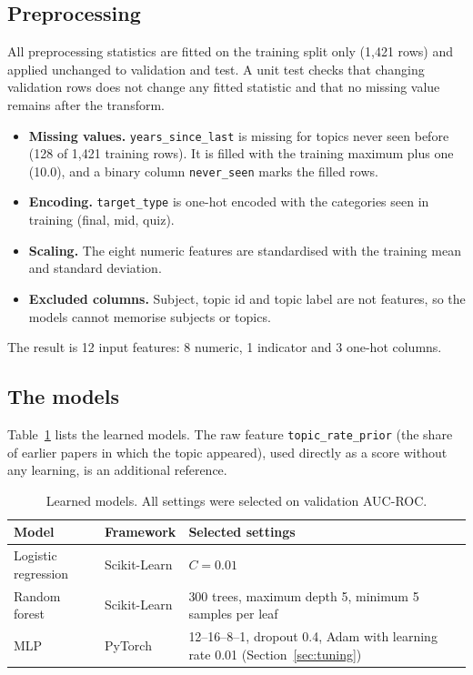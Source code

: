 \documentclass[11pt,a4paper]{article}
\newcommand{\trp}{\texttt{topic\_rate\_prior}}
\newcommand{\auc}{AUC-ROC}
\begin{document}
\subsection{Preprocessing}
\label{sec:prep}
All preprocessing statistics are fitted on the training split only (1{,}421 rows) and applied unchanged to validation
and test. A unit test checks that changing validation rows does not change any fitted statistic and that no missing
value remains after the transform.
\begin{itemize}
\item \textbf{Missing values.} \texttt{years\_since\_last} is missing for topics never seen before (128 of 1{,}421
training rows). It is filled with the training maximum plus one (10.0), and a binary column \texttt{never\_seen}
marks the filled rows.
\item \textbf{Encoding.} \texttt{target\_type} is one-hot encoded with the categories seen in training (final, mid, quiz).
\item \textbf{Scaling.} The eight numeric features are standardised with the training mean and standard deviation.
\item \textbf{Excluded columns.} Subject, topic id and topic label are not features, so the models cannot memorise
subjects or topics.
\end{itemize}
The result is 12 input features: 8 numeric, 1 indicator and 3 one-hot columns.

\subsection{The models}
Table~\ref{tab:models} lists the learned models. The raw feature \trp{} (the share of earlier papers in which the topic
appeared), used directly as a score without any learning, is an additional reference.

\begin{table}[!htb]
\centering
\small
\begin{tabular}{llp{7.2cm}}
\toprule
Model & Framework & Selected settings \\
\midrule
Logistic regression & Scikit-Learn & $C = 0.01$ \\
Random forest & Scikit-Learn & 300 trees, maximum depth 5, minimum 5 samples per leaf \\
MLP & PyTorch & 12--16--8--1, dropout 0.4, Adam with learning rate 0.01 (Section~\ref{sec:tuning}) \\
\bottomrule
\end{tabular}
\caption{Learned models. All settings were selected on validation \auc{}.}
\label{tab:models}
\end{table}
\end{document}
